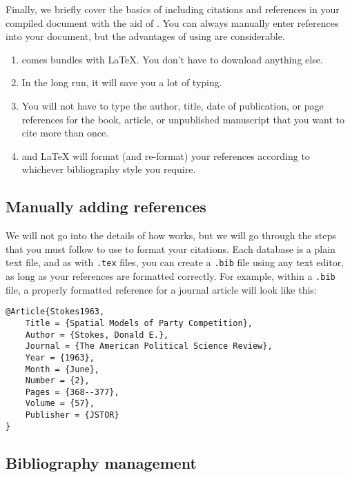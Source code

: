 Finally, we briefly cover the basics of including citations and references in your compiled document with the aid of . You can always manually enter references into your document, but the advantages of using  are considerable.

\begin{enumerate}
\item {} comes bundles with \LaTeX{}. You don't have to download anything else.

\item In the long run, it will save you a lot of typing.

\item You will not have to type the author, title, date of publication, or page references for the book, article, or unpublished manuscript that you want to cite more than once.

\item {} and \LaTeX{} will format (and re-format) your references according to whichever bibliography style you require.
\end{enumerate}

\subsection{Manually adding references}

We will not go into the details of how  works, but we will go through the steps that you must follow to use  to format your citations. Each  database is a plain text file, and as with \texttt{.tex} files, you can create a \texttt{.bib} file using any text editor, as long as your references are formatted correctly. For example, within a \texttt{.bib} file, a properly formatted reference for a journal article will look like this:

\begin{lstlisting}
@Article{Stokes1963,
	Title = {Spatial Models of Party Competition},
	Author = {Stokes, Donald E.},
	Journal = {The American Political Science Review},
	Year = {1963},
	Month = {June},
	Number = {2},
	Pages = {368--377},
	Volume = {57},
	Publisher = {JSTOR}
}
\end{lstlisting}

\subsection{Bibliography management}

